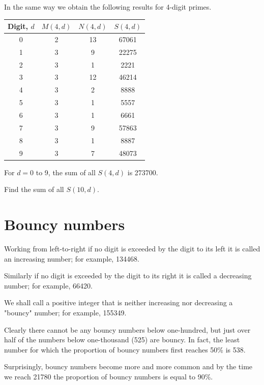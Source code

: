 In the same way we obtain the following results for 4-digit primes.

\begin{center}
    \begin{tabular}{|c|c|c|c|}
        \hline
        \rowcolor{lightgray} Digit, $d$ & $M(4, d)$ & $N(4, d)$ & $S(4, d)$\\
        \hline
        0 & 2 & 13 & 67061\\
        \hline
        1 & 3 & 9 & 22275\\
        \hline
        2 & 3 & 1 & 2221\\
        \hline
        3 & 3 & 12 & 46214\\
        \hline
        4 & 3 & 2 & 8888\\
        \hline
        5 & 3 & 1 & 5557\\
        \hline
        6 & 3 & 1 & 6661\\
        \hline
        7 & 3 & 9 & 57863\\
        \hline
        8 & 3 & 1 & 8887\\
        \hline
        9 & 3 & 7 & 48073\\
        \hline
    \end{tabular}
\end{center}

For $d = 0$ to 9, the sum of all $S(4, d)$ is 273700.
\medskip

Find the sum of all $S(10, d)$.


\section{Bouncy numbers} \label{pb.0112}

Working from left-to-right if no digit is exceeded by the digit to its left it is called an increasing number; for example, 134468.

Similarly if no digit is exceeded by the digit to its right it is called a decreasing number; for example, 66420.

We shall call a positive integer that is neither increasing nor decreasing a "bouncy" number; for example, 155349.

Clearly there cannot be any bouncy numbers below one-hundred, but just over half of the numbers below one-thousand (525) are bouncy. In fact, the least number for which the proportion of bouncy numbers first reaches 50\% is 538.

Surprisingly, bouncy numbers become more and more common and by the time we reach 21780 the proportion of bouncy numbers is equal to 90\%.

